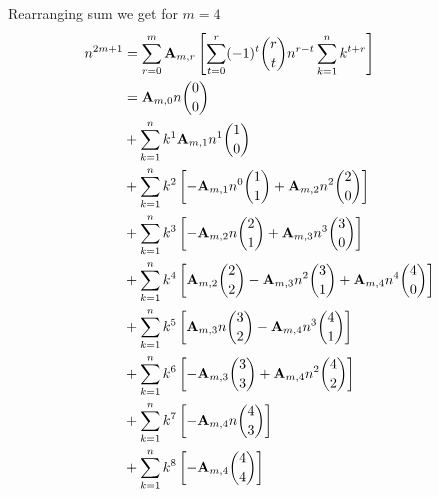 Rearranging sum we get for $m=4$
\begin{equation}
    \begin{split}
        n^{2m+1}
        &= \sum_{r=0}^{m} {\mathbf{A}} \sb{m,r} \left[ \sum_{t=0}^{r} (-1)^t \binom{r}{t} n^{r-t} \sum_{k=1}^{n} k^{t+r} \right] \\
        &= {\mathbf{A}} \sb{m,0} n \binom{0}{0}\\
        &+ \sum_{k=1}^{n} k^{1} {\mathbf{A}} \sb{m,1} n^{1} \binom{1}{0} \\
        &+ \sum_{k=1}^{n} k^{2} \left[ - {\mathbf{A}} \sb{m,1} n^{0} \binom{1}{1} + {\mathbf{A}} \sb{m,2} n^{2} \binom{2}{0} \right] \\
        &+ \sum_{k=1}^{n} k^{3} \left[ - {\mathbf{A}} \sb{m,2} n \binom{2}{1} + {\mathbf{A}} \sb{m,3} n^3 \binom{3}{0} \right] \\
        &+ \sum_{k=1}^{n} k^{4} \left[ {\mathbf{A}} \sb{m,2} \binom{2}{2} - {\mathbf{A}} \sb{m,3} n^2 \binom{3}{1} + {\mathbf{A}} \sb{m,4} n^4 \binom{4}{0} \right] \\
        &+ \sum_{k=1}^{n} k^{5} \left[ {\mathbf{A}} \sb{m,3} n \binom{3}{2} - {\mathbf{A}} \sb{m,4} n^3 \binom{4}{1} \right] \\
        &+ \sum_{k=1}^{n} k^{6} \left[ - {\mathbf{A}} \sb{m,3} \binom{3}{3} + {\mathbf{A}} \sb{m,4} n^2 \binom{4}{2} \right] \\
        &+ \sum_{k=1}^{n} k^{7} \left[ - {\mathbf{A}} \sb{m,4} n \binom{4}{3} \right] \\
        &+ \sum_{k=1}^{n} k^{8} \left[ - {\mathbf{A}} \sb{m,4} \binom{4}{4} \right]
    \end{split}\label{eq:equation18}
\end{equation}